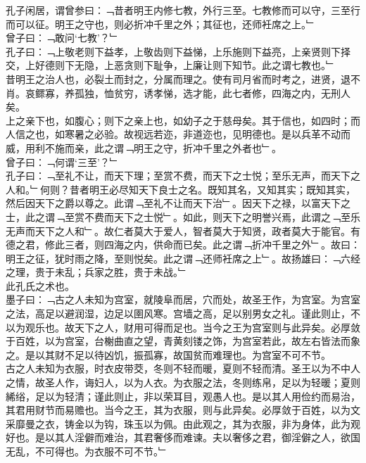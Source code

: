 孔子闲居，谓曾参曰：﹁昔者明王内修七教，外行三至。七教修而可以守，三至行而可以征。明王之守也，则必折冲千里之外；其征也，还师衽席之上。﹂\\
曾子曰：﹁敢问‘七教’？﹂\\
孔子曰：﹁上敬老则下益孝，上敬齿则下益悌，上乐施则下益亮，上亲贤则下择交，上好德则下无隐，上恶贪则下耻争，上廉让则下知节。此之谓七教也。﹂\\
昔明王之治人也，必裂土而封之，分属而理之。使有司月省而时考之，进贤，退不肖。哀鳏寡，养孤独，恤贫穷，诱孝悌，选才能，此七者修，四海之内，无刑人矣。\\
上之亲下也，如腹心；则下之亲上也，如幼子之于慈母矣。其于信也，如四时；而人信之也，如寒暑之必验。故视远若迩，非道迩也，见明德也。是以兵革不动而威，用利不施而亲，此之谓﹁明王之守，折冲千里之外者也﹂。
\\
曾子曰：﹁何谓‘三至’？﹂\\
孔子曰：﹁至礼不让，而天下理；至赏不费，而天下之士悦；至乐无声，而天下之人和。﹂何则？昔者明王必尽知天下良士之名。既知其名，又知其实；既知其实，然后因天下之爵以尊之。此谓﹁至礼不让而天下治﹂。因天下之禄，以富天下之士，此之谓﹁至赏不费而天下之士悦﹂。如此，则天下之明誉兴焉，此谓之﹁至乐无声而天下之人和﹂。故仁者莫大于爱人，智者莫大于知贤，政者莫大于能官。有德之君，修此三者，则四海之内，供命而已矣。此之谓﹁折冲千里之外﹂。故曰：明王之征，犹时雨之降，至则悦矣。此之谓﹁还师衽席之上﹂。故扬雄曰：﹁六经之理，贵于未乱；兵家之胜，贵于未战。﹂\\
此孔氏之术也。\\
墨子曰：﹁古之人未知为宫室，就陵阜而居，穴而处，故圣王作，为宫室。为宫室之法，高足以避润湿，边足以圉风寒。宫墙之高，足以别男女之礼。谨此则止，不以为观乐也。故天下之人，财用可得而足也。当今之王为宫室则与此异矣。必厚敛于百姓，以为宫室，台榭曲直之望，青黄刻镂之饰，为宫室若此，故左右皆法而象之。是以其财不足以待凶饥，振孤寡，故国贫而难理也。为宫室不可不节。\\
古之人未知为衣服，时衣皮带茭，冬则不轻而暖，夏则不轻而清。圣王以为不中人之情，故圣人作，诲妇人，以为人衣。为衣服之法，冬则练帛，足以为轻暖；夏则絺绤，足以为轻清；谨此则止，非以荣耳目，观愚人也。是以其人用俭约而易治，其君用财节而易赡也。当今之王，其为衣服，则与此异矣。必厚敛于百姓，以为文采靡曼之衣，铸金以为钩，珠玉以为佩。由此观之，其为衣服，非为身体，此为观好也。是以其人淫僻而难治，其君奢侈而难谏。夫以奢侈之君，御淫僻之人，欲国无乱，不可得也。为衣服不可不节。﹂\\
